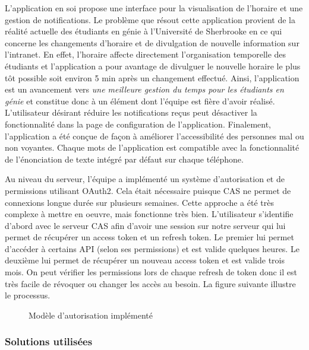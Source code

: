        L'application en soi propose une interface pour la visualisation de l'horaire et une gestion de notifications. Le problème que résout cette application provient de la réalité actuelle des étudiants en génie à l'Université de Sherbrooke en ce qui concerne les changements d'horaire et de divulgation de nouvelle information sur l'intranet. En effet, l'horaire affecte directement l'organisation temporelle des étudiants et l'application a pour avantage de divulguer le nouvelle horaire le plus tôt possible soit environ 5 min après un changement effectué. Ainsi, l'application est un avancement vers \emph{une meilleure gestion du temps pour les étudiants en génie} et constitue donc à un élément dont l'équipe est fière d'avoir réalisé. L'utilisateur désirant réduire les notifications reçus peut désactiver la fonctionnalité dans la page de configuration de l'application. Finalement, l'application a été conçue de façon à améliorer l'accessibilité des personnes mal ou non voyantes. Chaque mots de l'application est compatible avec la fonctionnalité de l'énonciation de texte intégré par défaut sur chaque téléphone.

        Au niveau du serveur, l'équipe a implémenté un système d'autorisation et de permissions utilisant OAuth2. Cela était nécessaire puisque CAS ne permet de connexions longue durée sur plusieurs semaines. Cette approche a été très complexe à mettre en oeuvre, mais fonctionne très bien. L'utilisateur s'identifie d'abord avec le serveur CAS afin d'avoir une session sur notre serveur qui lui permet de récupérer un access token et un refresh token. Le premier lui permet d'accéder à certains API (selon ses permissions) et est valide quelques heures. Le deuxième lui permet de récupérer un nouveau access token et est valide trois mois. On peut vérifier les permissions lors de chaque refresh de token donc il est très facile de révoquer ou changer les accès au besoin. La figure suivante illustre le processus.
    
        \begin{figure}[hp] \centering
            
            \caption{Modèle d'autorisation implémenté}
            \label{fig.modeleAutorisation}
        \end{figure}  

        \subsubsection{Solutions utilisées}
